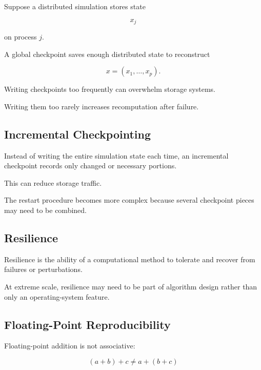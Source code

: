 Suppose a distributed simulation stores state

\[
x_j
\]

on process \(j\).

A global checkpoint saves enough distributed state to reconstruct

\[
\boxed{
x
=
(x_1,\ldots,x_p).
}
\]

Writing checkpoints too frequently can overwhelm storage systems.

Writing them too rarely increases recomputation after failure.

\subsection{Incremental Checkpointing}
\label{subsec:incremental-checkpointing}

Instead of writing the entire simulation state each time, an incremental
checkpoint records only changed or necessary portions.

This can reduce storage traffic.

The restart procedure becomes more complex because several checkpoint
pieces may need to be combined.

\subsection{Resilience}
\label{subsec:hpmc-resilience}

Resilience is the ability of a computational method to tolerate and recover
from failures or perturbations.

At extreme scale, resilience may need to be part of algorithm design rather
than only an operating-system feature.

\subsection{Floating-Point Reproducibility}
\label{subsec:hpmc-floating-point-reproducibility}

Floating-point addition is not associative:

\[
\boxed{
(a+b)+c
\neq
a+(b+c)
}
\]

